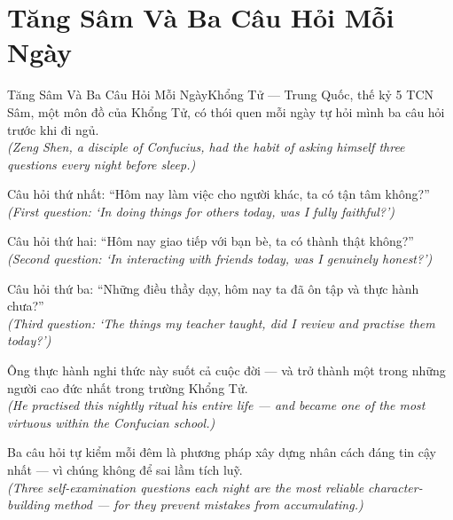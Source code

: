 \section{Tăng Sâm Và Ba Câu Hỏi Mỗi Ngày}
\begin{truyen}{Tăng Sâm Và Ba Câu Hỏi Mỗi Ngày}{Khổng Tử --- Trung Quốc, thế kỷ 5 TCN}
 Sâm, một môn đồ của Khổng Tử, có thói quen mỗi ngày tự hỏi mình ba câu hỏi trước khi đi ngủ.\\[4pt]
\textit{(Zeng Shen, a disciple of Confucius, had the habit of asking himself three questions every night before sleep.)}

Câu hỏi thứ nhất: ``Hôm nay làm việc cho người khác, ta có tận tâm không?''\\[4pt]
\textit{(First question: `In doing things for others today, was I fully faithful?')}

Câu hỏi thứ hai: ``Hôm nay giao tiếp với bạn bè, ta có thành thật không?''\\[4pt]
\textit{(Second question: `In interacting with friends today, was I genuinely honest?')}

Câu hỏi thứ ba: ``Những điều thầy dạy, hôm nay ta đã ôn tập và thực hành chưa?''\\[4pt]
\textit{(Third question: `The things my teacher taught, did I review and practise them today?')}

Ông thực hành nghi thức này suốt cả cuộc đời --- và trở thành một trong những người cao đức nhất trong trường Khổng Tử.\\[4pt]
\textit{(He practised this nightly ritual his entire life --- and became one of the most virtuous within the Confucian school.)}

\end{truyen}
\begin{baihoc}
  Ba câu hỏi tự kiểm mỗi đêm là phương pháp xây dựng nhân cách đáng tin cậy nhất --- vì chúng không để sai lầm tích luỹ.\\[4pt]
  \textit{(Three self-examination questions each night are the most reliable character-building method --- for they prevent mistakes from accumulating.)}
\end{baihoc}


